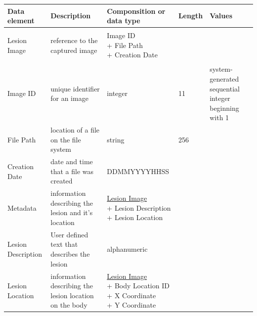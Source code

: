                 \begin{longtable}[H]{ | l | p{3.0cm} | p{2.5cm} | p{1.0cm} | p{2.5cm} | }

                    \hline
                    \textbf{Data element} & \textbf{Description} & \textbf{Componsition or data type} & \textbf{Length} & \textbf{Values} \\ \hline

                    \hypertarget{lesion_image}{Lesion Image} & reference to the captured image &

                        \specialcell[t]{Image ID
                           \\ + File Path
                           \\ + Creation Date
                        }

                     & & \\ \hline

                    Image ID & unique identifier for an image &
                    integer & 11 & system-generated sequential integer beginning with 1 \\ \hline

                    File Path & location of a file on the file system &
                    string & 256 &  \\ \hline

                    Creation Date & date and time that a file was created &
                    DDMMYYYYHHSS &  &  \\ \hline

                    Metadata & information describing the lesion and it's location &

                        \specialcell[t]{\hyperlink{lesion_image}{Lesion Image}
                           \\ + Lesion Description
                           \\ + Lesion Location
                        }

                     & & \\ \hline

                    Lesion Description & User defined text that describes the lesion &
                    alphanumeric &  &  \\ \hline

                    Lesion Location & information describing the lesion location on the body &

                        \specialcell[t]{\hyperlink{lesion_image}{Lesion Image}
                           \\ + Body Location ID
                           \\ + X Coordinate
                           \\ + Y Coordinate
                        }


\end{longtable}
